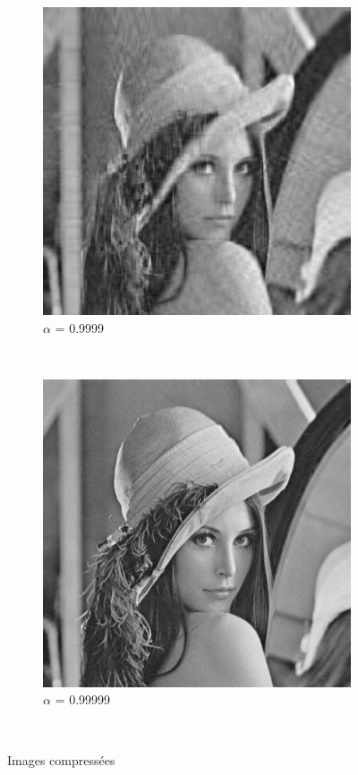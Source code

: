 \documentclass{report}
\begin{document}
\begin{figure}[H]
\begin{center}
        			\begin{subfigure}{0.5\textwidth}
	                	\includegraphics[width=\textwidth]{sources/Q5_9999.jpg}
		                \caption{$\alpha$ = 0.9999}
        			\end{subfigure}%
        			~
        			\begin{subfigure}{0.5\textwidth}
	                	\includegraphics[width=\textwidth]{sources/Q5_99999.jpg}
		                \caption{$\alpha$ = 0.99999}
        			\end{subfigure}%
        			~
        			\caption{Images compressées}\label{fig:animals}
        		\end{center}
			\end{figure}
			
\end{document}
